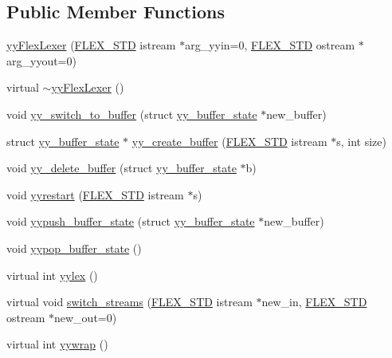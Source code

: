 \subsection*{Public Member Functions}
\begin{DoxyCompactItemize}
\item 
\hyperlink{classyyFlexLexer_a327ec30fcb12fcdbff3a0b776ed40504}{yy\+Flex\+Lexer} (\hyperlink{FlexLexer_8h_ae50ff830f34b9e244163babb41a1552d}{F\+L\+E\+X\+\_\+\+S\+TD} istream $\ast$arg\+\_\+yyin=0, \hyperlink{FlexLexer_8h_ae50ff830f34b9e244163babb41a1552d}{F\+L\+E\+X\+\_\+\+S\+TD} ostream $\ast$arg\+\_\+yyout=0)
\item 
virtual \hyperlink{classyyFlexLexer_a7962c3ff1926bba84f4bdd831e99f85d}{$\sim$yy\+Flex\+Lexer} ()
\item 
void \hyperlink{classyyFlexLexer_ad1d304c93cf758e1ae4db98d9ca35ad0}{yy\+\_\+switch\+\_\+to\+\_\+buffer} (struct \hyperlink{structyy__buffer__state}{yy\+\_\+buffer\+\_\+state} $\ast$new\+\_\+buffer)
\item 
struct \hyperlink{structyy__buffer__state}{yy\+\_\+buffer\+\_\+state} $\ast$ \hyperlink{classyyFlexLexer_ac72d57010353577c918e72eba3d8972a}{yy\+\_\+create\+\_\+buffer} (\hyperlink{FlexLexer_8h_ae50ff830f34b9e244163babb41a1552d}{F\+L\+E\+X\+\_\+\+S\+TD} istream $\ast$s, int size)
\item 
void \hyperlink{classyyFlexLexer_a645a8ebb5b2b5b80707d053a0eb7a21a}{yy\+\_\+delete\+\_\+buffer} (struct \hyperlink{structyy__buffer__state}{yy\+\_\+buffer\+\_\+state} $\ast$b)
\item 
void \hyperlink{classyyFlexLexer_ab337dd3bd9504644164c0600d960b6e2}{yyrestart} (\hyperlink{FlexLexer_8h_ae50ff830f34b9e244163babb41a1552d}{F\+L\+E\+X\+\_\+\+S\+TD} istream $\ast$s)
\item 
void \hyperlink{classyyFlexLexer_ad1c28db628d822013851d46fddbab4b2}{yypush\+\_\+buffer\+\_\+state} (struct \hyperlink{structyy__buffer__state}{yy\+\_\+buffer\+\_\+state} $\ast$new\+\_\+buffer)
\item 
void \hyperlink{classyyFlexLexer_a40740ddffd5cbf7b8f09ab0a7ee4fb3f}{yypop\+\_\+buffer\+\_\+state} ()
\item 
virtual int \hyperlink{classyyFlexLexer_a49826cc55dd4c5e668d9391b80a57274}{yylex} ()
\item 
virtual void \hyperlink{classyyFlexLexer_ae88d47b620670ef7a924f4fe1e70774b}{switch\+\_\+streams} (\hyperlink{FlexLexer_8h_ae50ff830f34b9e244163babb41a1552d}{F\+L\+E\+X\+\_\+\+S\+TD} istream $\ast$new\+\_\+in, \hyperlink{FlexLexer_8h_ae50ff830f34b9e244163babb41a1552d}{F\+L\+E\+X\+\_\+\+S\+TD} ostream $\ast$new\+\_\+out=0)
\item 
virtual int \hyperlink{classyyFlexLexer_a9e46b16e6374b1b7ae696e2ba5fdc07c}{yywrap} ()
\end{DoxyCompactItemize}

